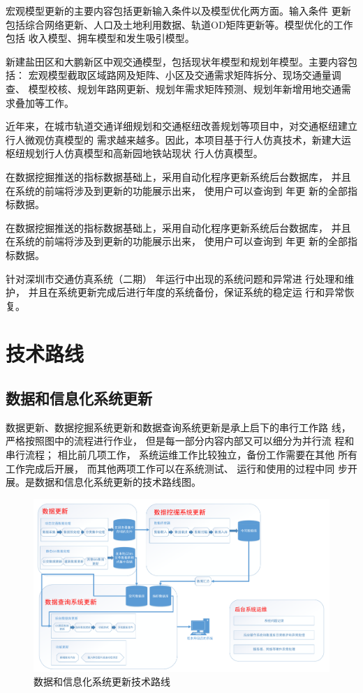宏观模型更新的主要内容包括更新输入条件以及模型优化两方面。输入条件
更新包括综合网络更新、人口及土地利用数据、轨道OD矩阵更新等。模型优化的工作包括
收入模型、拥车模型和发生吸引模型。

新建盐田区和大鹏新区中观交通模型，包括现状年模型和规划年模型。主要内容包括：
宏观模型截取区域路网及矩阵、小区及交通需求矩阵拆分、现场交通量调查、
模型校核、规划年路网更新、规划年需求矩阵预测、规划年新增用地交通需求叠加等工作。

近年来，在城市轨道交通详细规划和交通枢纽改善规划等项目中，对交通枢纽建立行人微观仿真模型的
需求越来越多。因此，本项目基于行人仿真技术，新建大运枢纽规划行人仿真模型和高新园地铁站现状
行人仿真模型。

在数据挖掘推送的指标数据基础上，采用自动化程序更新系统后台数据库，
并且在系统的前端将涉及到更新的功能展示出来， 使用户可以查询到 \pyear 年更
新的全部指标数据。

在数据挖掘推送的指标数据基础上，采用自动化程序更新系统后台数据库，
并且在系统的前端将涉及到更新的功能展示出来， 使用户可以查询到 \pyear 年更
新的全部指标数据。

针对深圳市交通仿真系统（二期） \pyear 年运行中出现的系统问题和异常进
行处理和维护， 并且在系统更新完成后进行年度的系统备份，保证系统的稳定运
行和异常恢复。

\section{技术路线}
\subsection{数据和信息化系统更新}
数据更新、数据挖掘系统更新和数据查询系统更新是承上启下的串行工作路
线，严格按照图中的流程进行作业， 但是每一部分内容内部又可以细分为并行流
程和串行流程； 相比前几项工作， 系统运维工作比较独立，备份工作需要在其他
所有工作完成后开展， 而其他两项工作可以在系统测试、 运行和使用的过程中同
步开展。是数据和信息化系统更新的技术路线图。

\begin{figure}[ht]
  \centering
  \includegraphics[width=\textwidth]{figures/chp01_数据和信息化更新技术路线.pdf}
  \caption{数据和信息化系统更新技术路线\label{fig:数据和信息化更新技术路线} }
\end{figure}


